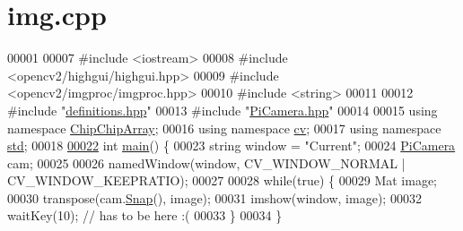 \hypertarget{img_8cpp_source}{\section{img.\+cpp}
\label{img_8cpp_source}
}

\begin{DoxyCode}
00001 
00007 \textcolor{preprocessor}{#include <iostream>}
00008 \textcolor{preprocessor}{#include <opencv2/highgui/highgui.hpp>}
00009 \textcolor{preprocessor}{#include <opencv2/imgproc/imgproc.hpp>}
00010 \textcolor{preprocessor}{#include <string>}
00011 
00012 \textcolor{preprocessor}{#include "\hyperlink{definitions_8hpp}{definitions.hpp}"}
00013 \textcolor{preprocessor}{#include "\hyperlink{PiCamera_8hpp}{PiCamera.hpp}"}
00014 
00015 \textcolor{keyword}{using namespace }\hyperlink{namespaceChipChipArray}{ChipChipArray};
00016 \textcolor{keyword}{using namespace }\hyperlink{namespacecv}{cv};
00017 \textcolor{keyword}{using namespace }\hyperlink{namespacestd}{std};
00018 
\hypertarget{img_8cpp_source_l00022}{}\hyperlink{img_8cpp_ae66f6b31b5ad750f1fe042a706a4e3d4}{00022} \textcolor{keywordtype}{int} \hyperlink{namespaceChipChipArray_a7fc3d1edffca11531cd09fdab7c8b88d}{main}() \{
00023     \textcolor{keywordtype}{string} window = \textcolor{stringliteral}{"Current"};
00024     \hyperlink{classChipChipArray_1_1PiCamera}{PiCamera} cam;
00025     
00026     namedWindow(window, CV\_WINDOW\_NORMAL | CV\_WINDOW\_KEEPRATIO);
00027 
00028     \textcolor{keywordflow}{while}(\textcolor{keyword}{true}) \{
00029         Mat image;
00030         transpose(cam.\hyperlink{classChipChipArray_1_1PiCamera_a58fb0de02570dce9a9cb60a1a04fb84f}{Snap}(), image);
00031         imshow(window, image);
00032         waitKey(10);  \textcolor{comment}{// has to be here :(}
00033     \}
00034 \}
\end{DoxyCode}

